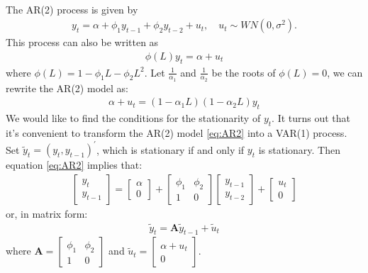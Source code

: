 \begin{eg}[AR(2) Process]\label{eg:AR2}
    \
    
    The AR(2) process is given by
    \begin{gather}\label{eq:AR2}
        y_t = \alpha + \phi_1 y_{t-1} + \phi_2 y_{t-2} + u_t, \quad u_t \sim WN(0, \sigma^2).
    \end{gather}
    This process can also be written as
    \begin{gather*}
        \phi(L) y_t = \alpha + u_t
    \end{gather*}
    where $\phi(L) = 1 - \phi_1 L - \phi_2 L^2$.
    Let $\frac{1}{\alpha_1}$ and $\frac{1}{\alpha_2}$ be the roots of $\phi(L) = 0$,
    we can rewrite the AR(2) model as:
    \begin{gather*}
        \alpha + u_t = (1-\alpha_1 L)(1-\alpha_2 L) y_t
    \end{gather*}
    We would like to find the conditions for the stationarity of $y_t$.
    It turns out that it's convenient to transform the AR(2) model \ref{eq:AR2} into a VAR(1) process.
    Set $\tilde{y}_t = (y_t, y_{t-1})^{\prime}$, which is stationary if and only if $y_t$ is stationary.
    Then equation \ref{eq:AR2} implies that:
    \begin{gather*}
        \begin{bmatrix}
            y_t \\
            y_{t-1}
        \end{bmatrix} = \begin{bmatrix}
            \alpha \\
            0
        \end{bmatrix} + \begin{bmatrix}
            \phi_1 & \phi_2 \\
            1 & 0
        \end{bmatrix} \begin{bmatrix}
            y_{t-1} \\
            y_{t-2}
        \end{bmatrix} + \begin{bmatrix}
            u_t \\
            0
        \end{bmatrix}
    \end{gather*}
    or, in matrix form:
    \begin{gather*}
        \tilde{y}_t = \mathbf{A} \tilde{y}_{t-1} + \tilde{u}_t
    \end{gather*}
    where $\mathbf{A} = \begin{bmatrix}
        \phi_1 & \phi_2 \\
        1 & 0
    \end{bmatrix}$ and $\tilde{u}_t = \begin{bmatrix}
        \alpha + u_t \\
        0
    \end{bmatrix}$.
\end{eg}
